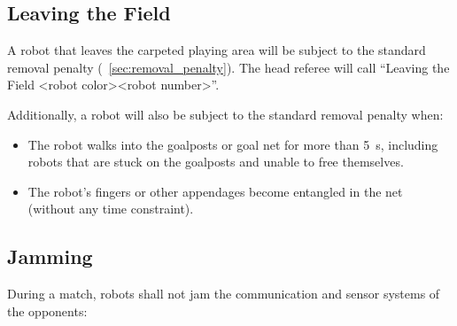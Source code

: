\subsection{Leaving the Field}
\label{sec:leaving_the_field}

A robot that leaves the carpeted playing area will be subject to the standard removal penalty (\cf~\cref{sec:removal_penalty}). The head referee will call ``Leaving the Field \textless robot color\textgreater \textless robot number\textgreater''.

Additionally, a robot will also be subject to the standard removal penalty when:
\begin{itemize}
  \item The robot walks into the goalposts or goal net for more than \qty{5}{\second}, including robots that are stuck on the goalposts and unable to free themselves.
  \item The robot's fingers or other appendages become entangled in the net (without any time constraint).
\end{itemize}

\subsection{Jamming}
\label{sec:jamming}

During a match, robots shall not jam the communication and sensor systems of the opponents:

